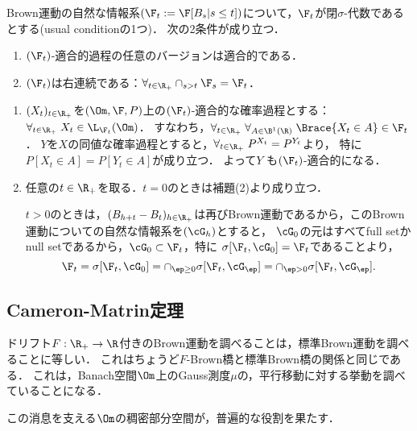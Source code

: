\documentclass[uplatex,dvipdfmx]{jsreport}
\begin{document}
\begin{proposition}[自然な情報系の右連続性]
    Brown運動の自然な情報系$(\F_t:=\F[B_s|s\le t])$について，$\F_t$が閉$\sigma$-代数であるとする(usual conditionの1つ)．
    次の2条件が成り立つ．
    \begin{enumerate}
        \item $(\F_t)$-適合的過程の任意のバージョンは適合的である．
        \item $(\F_t)$は右連続である：$\forall_{t\in\R_+}\cap_{s>t}\F_s=\F_t$．
    \end{enumerate}
\end{proposition}
\begin{Proof}\mbox{}
    \begin{enumerate}
        \item $(X_t)_{t\in\R_+}$を$(\Om,\F,P)$上の$(\F_t)$-適合的な確率過程とする：$\forall_{t\in\R_+}\;X_t\in\L_{\F_t}(\Om)$．
        すなわち，$\forall_{t\in\R_+}\;\forall_{A\in\B^1(\R)}\;\Brace{X_t\in A}\in\F_t$．
        $Y$を$X$の同値な確率過程とすると，$\forall_{t\in\R_+}\;P^{X_t}=P^{Y_t}$より，
        特に$P[X_t\in A]=P[Y_t\in A]$が成り立つ．
        よって$Y$
        も$(\F_t)$-適合的になる．
        \item 
        任意の$t\in\R_+$を取る．$t=0$のときは補題(2)より成り立つ．

        $t>0$のときは，$(B_{h+t}-B_t)_{h\in\R_+}$は再びBrown運動であるから，このBrown運動についての自然な情報系を$(\cG_h)$とすると，
        $\cG_0$の元はすべてfull setかnull setであるから，$\cG_0\subset\F_t$，特に
        $\sigma[\F_t,\cG_0]=\F_t$であることより，
        \[\F_t=\sigma[\F_t,\cG_0]=\cap_{\ep\ge0}\sigma[\F_t,\cG_\ep]=\cap_{\ep>0}\sigma[\F_t,\cG_\ep].\]
    \end{enumerate}
\end{Proof}


\subsection{Cameron-Matrin定理}

\begin{tcolorbox}[colframe=ForestGreen, colback=ForestGreen!10!white,breakable,colbacktitle=ForestGreen!40!white,coltitle=black,fonttitle=\bfseries\sffamily,
title=]
    ドリフト$F:\R_+\to\R$付きのBrown運動を調べることは，標準Brown運動を調べることに等しい．
    これはちょうど$F$-Brown橋と標準Brown橋の関係と同じである．
    これは，Banach空間$\Om$上のGauss測度$\mu$の，平行移動に対する挙動を調べていることになる．

    この消息を支える$\Om$の稠密部分空間が，普遍的な役割を果たす．
\end{tcolorbox}
\end{document}
